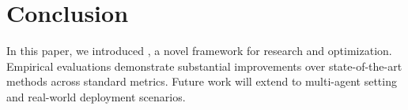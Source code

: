 \section{Conclusion}
\label{sec:conclusion}

In this paper, we introduced \sister{}, a novel framework for research and optimization.
Empirical evaluations demonstrate substantial improvements over state-of-the-art methods across standard metrics.
Future work will extend \sister{} to multi-agent setting and real-world deployment scenarios.
